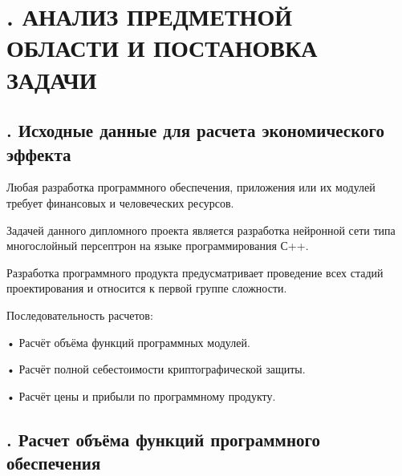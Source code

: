 \setcounter{chaptercntr}{6}

\sectionbreak \section*{
	\gostTitleFont
	\redline
	\thechaptercntr .
	АНАЛИЗ ПРЕДМЕТНОЙ ОБЛАСТИ И ПОСТАНОВКА ЗАДАЧИ
}

\titlespace

\subsection*{ 
	\gostTitleFont
	\redline
	\thechaptercntr .\thesubchaptercntr \spc
	Исходные данные для расчета экономического эффекта
} \addtocounter{subchaptercntr}{1}

\subtitlespace

{\gostFont
	
	
	\par \redline Любая разработка программного обеспечения, приложения или их модулей требует финансовых и человеческих ресурсов.
	
	\par \redline Задачей данного дипломного проекта является разработка нейронной сети типа многослойный персептрон на языке программирования С++.
	
	\par \redline Разработка программного продукта предусматривает проведение всех стадий проектирования и относится к первой группе сложности. 
	
	\par \redline Последовательность расчетов:
	
	\par \redline •  Расчёт объёма функций программных модулей.
	
	\par \redline •  Расчёт полной себестоимости криптографической защиты.
	
	\par \redline •  Расчёт цены и прибыли по программному продукту.

}

\subtitlespace

\subsection*{ 
	\gostTitleFont
	\redline
	\thechaptercntr .\thesubchaptercntr \spc
	Расчет объёма функций программного обеспечения
} \addtocounter{subchaptercntr}{1}

